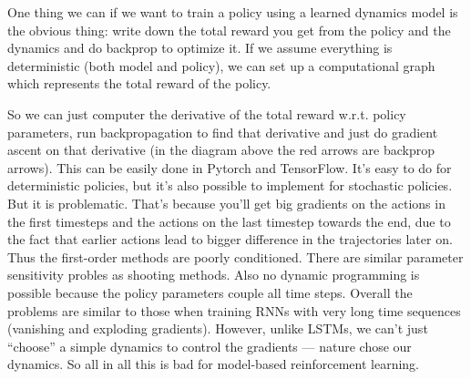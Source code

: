 \documentclass{report}
\begin{document}
One thing we can if we want to train a policy using a learned dynamics model is the obvious thing:
write down the total reward you get from the policy and the dynamics and do backprop to optimize it.
If we assume everything is deterministic (both model and policy), we can set up a computational graph
which represents the total reward of the policy.
\begin{figure}[htpb]
\begin{center}
\end{center}
\end{figure}
So we can just computer the derivative of the total reward w.r.t. policy parameters,
run backpropagation to find that derivative and just do gradient ascent on that derivative (in the diagram above
the red arrows are backprop arrows).
This can be easily done in Pytorch and TensorFlow.
It's easy to do for deterministic policies, but it's also possible to implement for stochastic policies.
But it is problematic.
That's because you'll get big gradients on the actions in the first timesteps and the actions on the last timestep towards the end,
due to the fact that earlier actions lead to bigger difference in the trajectories later on.
Thus the first-order methods are poorly conditioned.
There are similar parameter sensitivity probles as shooting methods. 
Also no dynamic programming is possible because the policy parameters couple all time steps.
Overall the problems are similar to those when training RNNs with very long time sequences (vanishing and exploding gradients).
However, unlike LSTMs, we can't just ``choose'' a simple dynamics to control the gradients --- nature chose our dynamics.
So all in all this is bad for model-based reinforcement learning.
\end{document}
